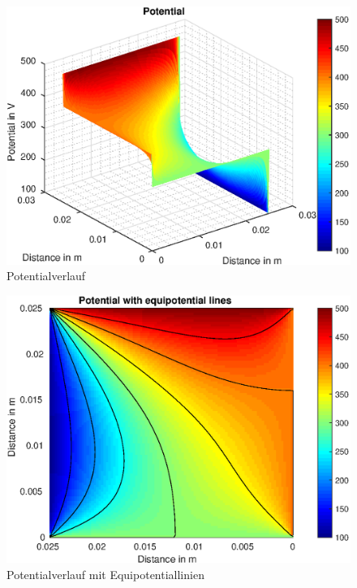 \begin{figure}[H]
	\centering
	\includegraphics[scale=1]{pics/Bsp_1_c/fig_1.eps}
	\caption{Potentialverlauf}
\end{figure}

\begin{figure}[H]
	\centering
	\includegraphics[scale=1]{pics/Bsp_1_c/fig_2.eps}
	\caption{Potentialverlauf mit Equipotentiallinien}
\end{figure}

